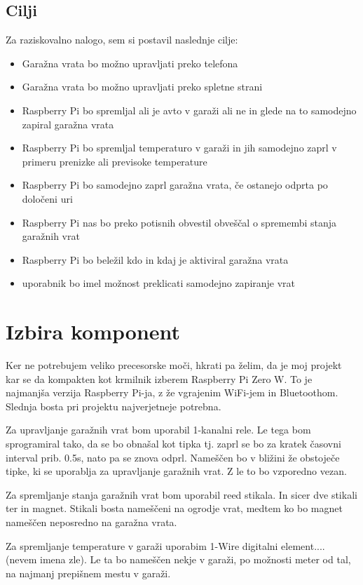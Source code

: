 \documentclass[11pt]{article}
\begin{document}
\subsection{Cilji}
Za raziskovalno nalogo, sem si postavil naslednje cilje:
\begin{itemize}
    \item Garažna vrata bo možno upravljati preko telefona
    \item Garažna vrata bo možno upravljati preko spletne strani
    \item Raspberry Pi bo spremljal ali je avto v garaži ali ne in glede na to samodejno zapiral garažna vrata
    \item Raspberry Pi bo spremljal temperaturo v garaži in jih samodejno zaprl v primeru prenizke ali previsoke temperature
    \item Raspberry Pi bo samodejno zaprl garažna vrata, če ostanejo odprta po določeni uri
    \item Raspberry Pi nas bo preko potisnih obvestil obveščal o spremembi stanja garažnih vrat
    \item Raspberry Pi bo beležil kdo in kdaj je aktiviral garažna vrata
    \item uporabnik bo imel možnost preklicati samodejno zapiranje vrat
\end{itemize}
 
 \newpage
\section{Izbira komponent}
  Ker ne potrebujem veliko precesorske moči, hkrati pa želim, da je moj projekt kar se da kompakten kot krmilnik izberem Raspberry Pi Zero W. To je najmanjša verzija Raspberry Pi-ja, z že vgrajenim WiFi-jem in Bluetoothom. Slednja bosta pri projektu najverjetneje potrebna.
  
  Za upravljanje garažnih vrat bom uporabil 1-kanalni rele. Le tega bom sprogramiral tako, da se bo obnašal kot tipka tj. zaprl se bo za kratek časovni interval prib. 0.5s, nato pa se znova odprl. Nameščen bo v bližini že obstoječe tipke, ki se uporablja za upravljanje garažnih vrat. Z le to bo vzporedno vezan.
  
  Za spremljanje stanja garažnih vrat bom uporabil reed stikala. In sicer dve stikali ter in magnet. Stikali bosta nameščeni na ogrodje vrat, medtem ko bo magnet nameščen neposredno na garažna vrata.
  
  Za spremljanje temperature v garaži uporabim 1-Wire digitalni element.... (nevem imena zle). Le ta bo nameščen nekje v garaži, po možnosti meter od tal, na najmanj prepišnem mestu v garaži.
  
\end{document}
